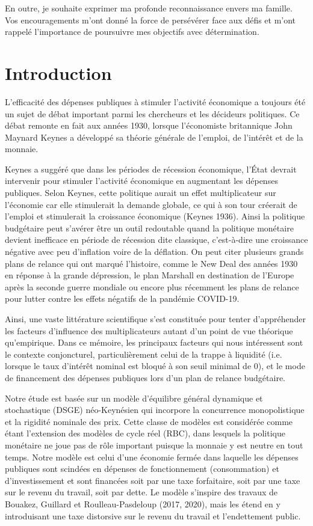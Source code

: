 \documentclass[12pt,letterpaper]{article}
\begin{document}
En outre, je souhaite exprimer ma profonde reconnaissance envers ma famille. Vos encouragements m'ont donné la force de persévérer face aux défis et m'ont rappelé l'importance de poursuivre mes objectifs avec détermination.

\newpage
{}

\section{Introduction}

L’efficacité des dépenses publiques à stimuler l'activité économique a toujours été un sujet de débat important parmi les chercheurs et les décideurs politiques. Ce débat remonte en fait aux années 1930, lorsque l'économiste britannique John Maynard Keynes a développé sa théorie générale de l'emploi, de l'intérêt et de la monnaie.

Keynes a suggéré que dans les périodes de récession économique, l'État devrait intervenir pour stimuler l'activité économique en augmentant les dépenses publiques. Selon Keynes, cette politique aurait un effet multiplicateur sur l'économie car elle stimulerait la demande globale, ce qui à son tour créerait de l'emploi et stimulerait la croissance économique (Keynes 1936). Ainsi la politique budgétaire peut s’avérer être un outil redoutable quand la politique monétaire devient inefficace en période de récession dite classique, c’est-à-dire une croissance négative avec peu d’inflation voire de la déflation. On peut citer plusieurs grands plans de relance qui ont marqué l’histoire, comme le New Deal des années 1930 en réponse à la grande dépression, le plan Marshall en destination de l’Europe après la seconde guerre mondiale ou encore plus récemment les plans de relance pour lutter contre les effets négatifs de la pandémie COVID-19.

Ainsi, une vaste littérature scientifique s’est constituée pour tenter d’appréhender les facteurs d’influence des multiplicateurs autant d’un point de vue théorique qu’empirique. Dans ce mémoire, les principaux facteurs qui nous intéressent sont le contexte conjoncturel, particulièrement celui de la trappe à liquidité (i.e. lorsque le taux d’intérêt nominal est bloqué à son seuil minimal de 0), et le mode de financement des dépenses publiques lors d’un plan de relance budgétaire.

Notre étude est basée sur un modèle d’équilibre général dynamique et stochastique (DSGE) néo-Keynésien qui incorpore la concurrence monopolistique et la rigidité nominale des prix. Cette classe de modèles est considérée comme étant l’extension des modèles de cycle réel (RBC), dans lesquels la politique monétaire ne joue pas de rôle important puisque la monnaie y est neutre en tout temps. Notre modèle est celui d’une économie fermée dans laquelle les dépenses publiques sont scindées en dépenses de fonctionnement (consommation) et d’investissement et sont financées soit par une taxe forfaitaire, soit par une taxe sur le revenu du travail, soit par dette. Le modèle s’inspire des travaux de Bouakez, Guillard et Roulleau-Pasdeloup (2017, 2020), mais les étend en y introduisant une taxe distorsive sur le revenu du travail et l’endettement public.
\end{document}
